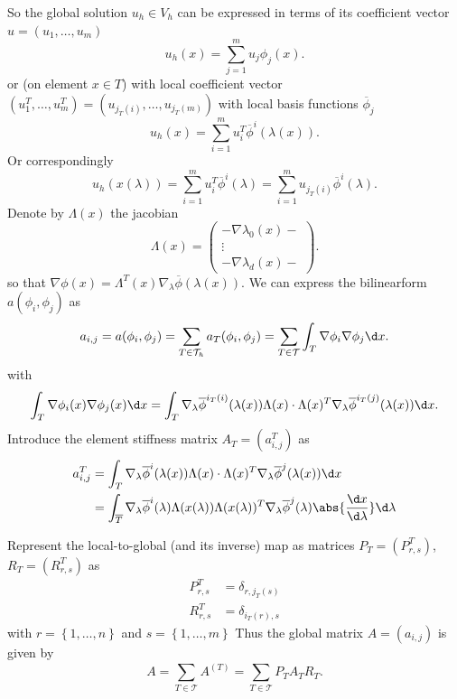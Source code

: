 So the global solution $u_{h}\in V_{h}$ can be expressed in terms of its coefficient vector $u = (u_1, \ldots , u_{m})$
\[
	u_{h}(x)=\sum_{j=1}^{m}{u_{j}\phi _{j}(x)}
.\] 
or (on element $x \in T$) with local coefficient vector $(u_1^{T}, \ldots , u_{m}^{T}) = (u_{j_{T}(i)}, \ldots , u_{j_{T}(m)})$ with local basis functions $\overline{\phi }_{j}$
\[
	u_{h}(x) = \sum_{i=1}^{m}{u_{i}^{T}\overline{\phi }^{i}(\lambda (x))}
.\] 
Or correspondingly 
\[
	u_{h}(x(\lambda )) = \sum_{i=1}^{m}{u_{i}^{T}\overline{\phi }^{i}(\lambda )}= \sum_{i=1}^{m}{u_{j_{T}(i)}\overline{\phi }^{i}(\lambda )}
.\] 
Denote by $\Lambda(x)$ the jacobian
\[
	\Lambda(x) = \begin{pmatrix}
		- \nabla \lambda_0(x) - \\
		\vdots \\
		- \nabla \lambda_{d}(x) -
	\end{pmatrix}
.\] 
so that $\nabla \phi (x) = \Lambda^{T}(x)\nabla _{\lambda }\overline{\phi }(\lambda (x))$. We can express the bilinearform $a(\phi _{i}, \phi _{j})$ as 
\[
  a_{i,j} = a(\phi _{i}, \phi _{j}) = \sum_{T \in \mathcal{T}_{h}}^{}{a_{T}(\phi _{i}, \phi _{j}}) = \sum_{T \in \mathcal{T}}^{}{\int_{T}\nabla \phi _{i} \nabla \phi _{j} \d x}
.\] 
with
\[
	\int_{T}\nabla \phi _{i}(x)\nabla \phi _{j}(x) \d x = \int_{T}\nabla _{\lambda }\overline{\phi }^{i_{T}(i)}(\lambda (x)) \Lambda(x) \cdot \Lambda(x)^{T} \nabla _{\lambda }\overline{\phi }^{i_{T}(j)}(\lambda (x)) \d x
.\] 
Introduce the element stiffness matrix $A_{T} = (a_{i,j}^{T})$ as
\begin{align*}
	a_{i,j}^{T} &= \int_{T}\nabla _{\lambda }\overline{\phi }^{i}(\lambda (x)) \Lambda(x) \cdot \Lambda(x)^{T} \nabla _{\lambda }\overline{\phi }^{j}(\lambda (x)) \d x \\
				&= \int_{\overline{T}} \nabla _{\lambda }\overline{\phi }^{i}(\lambda ) \Lambda(x(\lambda )) \Lambda (x(\lambda ))^{T} \nabla _{\lambda} \overline{\phi }^{j}(\lambda ) \abs{\frac{\d x}{\d \lambda }} \d \lambda 
\end{align*}

Represent the local-to-global (and its inverse) map as matrices $P_{T}= (P_{r,s}^{T})$, $R_{T}=(R_{r,s}^{T})$ as
\begin{align*}
	P_{r,s}^{T}&= \delta_{r,j_{T}(s)} \\
	R_{r,s}^{T}&= \delta_{i_{T}(r),s}
\end{align*}
with $r = \left\{ 1, \ldots, n \right\} $ and $s = \left\{ 1, \ldots, m \right\} $
Thus the global matrix $A=(a_{i,j})$ is given by
\[
	A = \sum_{T \in \mathcal{T}}^{}{A^{(T)}} = \sum_{T \in \mathcal{T}}^{}{P_{T}A_{T}R_{T}}
.\] 

